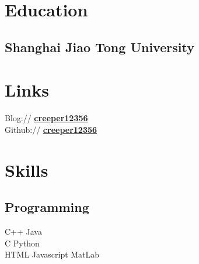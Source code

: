\documentclass[]{deedy-resume-openfont}
\begin{document}
%
%
\lastupdated

%
%

%
%

\begin{minipage}[t]{0.25\textwidth} 


\section{Education} 

\subsection{Shanghai Jiao Tong University}
\sectionsep
{}
\sectionsep


\section{Links}
\sectionsep
Blog://  \href{https://creeper12356.github.io/}{\bf creeper12356} \\ 
Github:// \href{https://github.com/creeper12356}{\bf creeper12356} \\


\section{Skills}
\sectionsep
\subsection{Programming}
C++ \textbullet{} Java \\
C \textbullet{} Python \\
HTML \textbullet{} Javascript \textbullet{} MatLab \\ 
\sectionsep


\end{minipage}
\end{document}
